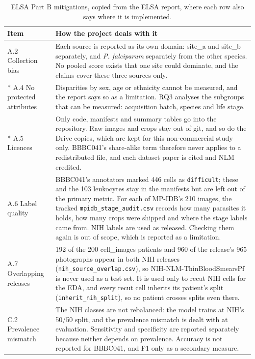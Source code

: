 \documentclass[11pt,a4paper]{article}
\begin{document}
{\small
\begin{longtable}{@{}>{\raggedright\arraybackslash\hspace{0pt}}p{79.7pt}>{\raggedright\arraybackslash\hspace{0pt}}p{256.3pt}@{}}
\toprule
Item & How the project deals with it \\
\midrule
\endhead
\bottomrule
\endfoot
\bottomrule
\caption{ELSA Part B mitigations, copied from the ELSA report, where each row also says where it is implemented.}
\endlastfoot
A.2 Collection bias & Each source is reported as its own domain: site\_\allowbreak{}a and site\_\allowbreak{}b separately, and \emph{P. falciparum} separately from the other species. No pooled score exists that one site could dominate, and the claims cover these three sources only. \\*
A.4 No protected attributes & Disparities by sex, age or ethnicity cannot be measured, and the report says so as a limitation. RQ3 analyses the subgroups that can be measured: acquisition batch, species and life stage. \\*
A.5 Licences & Only code, manifests and summary tables go into the repository. Raw images and crops stay out of git, and so do the Drive copies, which are kept for this non-commercial study only. BBBC041's share-alike term therefore never applies to a redistributed file, and each dataset paper is cited and NLM credited. \\
A.6 Label quality & BBBC041's annotators marked 446 cells as \texttt{difficult}; these and the 103 leukocytes stay in the manifests but are left out of the primary metric. For each of MP-IDB's 210 images, the tracked \texttt{mpidb\_\allowbreak{}stage\_\allowbreak{}audit.\allowbreak{}csv} records how many parasites it holds, how many crops were shipped and where the stage labels came from. NIH labels are used as released. Checking them again is out of scope, which is reported as a limitation. \\
A.7 Overlapping releases & 192 of the 200 cell\_\allowbreak{}images patients and 960 of the release's 965 photographs appear in both NIH releases (\texttt{nih\_\allowbreak{}source\_\allowbreak{}overlap.\allowbreak{}csv}), so NIH-NLM-ThinBloodSmearsPf is never used as a test set. It is used only to recut NIH cells for the EDA, and every recut cell inherits its patient's split (\texttt{inherit\_\allowbreak{}nih\_\allowbreak{}split}), so no patient crosses splits even there. \\
C.2 Prevalence mismatch & The NIH classes are not rebalanced: the model trains at NIH's 50/50 split, and the prevalence mismatch is dealt with at evaluation. Sensitivity and specificity are reported separately because neither depends on prevalence. Accuracy is not reported for BBBC041, and F1 only as a secondary measure. \\

\end{longtable}}
\end{document}
